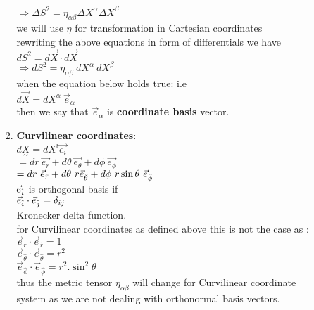 \documentclass[11pt,a4paper]{article}
\begin{document}
\begin{enumerate}
\begin{enumerate}
\begin{enumerate}
			                  $\Rightarrow \Delta{S^2} = {\displaystyle{\eta_{\alpha\beta}}} \Delta X^{\alpha} \Delta X^{\beta}$\\
			                  we will use $\eta$ for transformation in Cartesian coordinates\\
			                  rewriting the above equations in form of differentials we have\\
			                  $d{S^2} = d \vec{X} \cdot d\vec{X}$\\
			                  $\Rightarrow d {S^2} = {\displaystyle{\eta_{\alpha\beta}}}\ d X^{\alpha}\ d X^{\beta}$\\

			                  when the equation below holds true: i.e\\
			                  $d\vec{X}= dX^{\alpha}\ \vec{e}_{\alpha}$\\
			                  then we say that $\vec{e}_{\alpha}$ is \textbf{coordinate basis} vector.
			            \item \textbf{Curvilinear coordinates}:\\
			                  $d\underset{\sim}{X} = dX^i \vec{e_i}$\\
			                  $= d{r}\ \vec{e_r} + d\theta\ \vec{e_{\theta}} +d\phi\ \vec{e_{\phi}} $\\
			                  $= d{r}\ \vec{e}_{\hat{r}} + d\theta\ r \vec{e}_{\hat{\theta}} +d\phi\ r \sin\theta\ \vec{e}_{\Hat{\phi}} $\\

			                  $\vec{e}_{\Hat{i}}$ is orthogonal basis if \\
			                  $\vec{e}_{\Hat{i}}\cdot \vec{e}_{\Hat{j}} = \delta_{ij}$\\
			                  Kronecker delta function.\\
			                  for Curvilinear coordinates as defined above this is not the case as :\\
			                  $\vec{e}_{\hat{r}} \cdot \vec{e}_{\hat{r}} = 1 $\\
			                  $\vec{e}_{\hat{\theta}} \cdot \vec{e}_{\hat{\theta}} = r^2 $\\
			                  $\vec{e}_{\hat{\phi}} \cdot \vec{e}_{\hat{\phi}} = r^2.\sin^2\theta $\\
			                  thus the metric tensor ${\displaystyle{\eta_{\alpha\beta}}}$ will change for Curvilinear coordinate system as we are not dealing with orthonormal basis vectors.


\end{enumerate}
\end{enumerate}
\end{enumerate}
\end{document}
